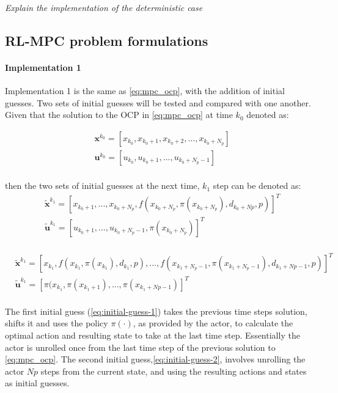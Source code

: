 \emph{Explain the implementation of the deterministic case}
\subsection{RL-MPC problem formulations}

\paragraph{Implementation 1}
Implementation 1 is the same as \autoref{eq:mpc_ocp}, with the addition of initial guesses. Two sets of initial guesses will be tested and compared with one another. Given that the solution to the OCP in \autoref{eq:mpc_ocp} at time $k_0$ denoted as:


\begin{equation}\label{eq:sol-mpc-ocp}
	\begin{aligned}
		&\mathbf{x}^{k_0} = [x_{k_0},x_{k_0 + 1},x_{k_0 + 2}, ...,x_{k_0 + N_p}] \\ 
		&\mathbf{u}^{k_0} = [u_{k_0},u_{k_0 + 1}, ...,u_{k_0 + N_p-1}] \\
	\end{aligned}
\end{equation}

then the two sets of initial guesses at the next time, $k_1$ step can be denoted as:
\begin{equation}\label{eq:initial-guess-1}
	\begin{aligned}
		&\tilde{\mathbf{x}}^{k_1} = [x_{k_0 + 1},...,x_{k_0 + N_p}, f(x_{k_0 + N_p}, \pi(x_{k_0 + N_p}), d_{k_0 + Np},p)]^T \\ 
		&\tilde{\mathbf{u}}^{k_1} = [u_{k_0 + 1},...,u_{k_0 + N_p - 1}, \pi(x_{k_0 + N_p})]^T \\ 
	\end{aligned}
\end{equation}

\begin{equation}\label{eq:initial-guess-2}
	\begin{aligned}
	&\tilde{\mathbf{x}}^{k_1} = [x_{k_1},f(x_{k_1},\pi(x_{k_1}),d_{k_1},p),..., f(x_{k_1 + N_p-1}, \pi(x_{k_1 + N_p-1}), d_{k_1 + Np-1},p)]^T \\ 
	&\tilde{\mathbf{u}}^{k_1} = [\pi(x_{k_1},\pi(x_{k_1+1}),...,\pi(x_{k_1+Np-1})]^T \\ 
\end{aligned}
\end{equation}

The first initial guess (\autoref{eq:initial-guess-1}) takes the previous time steps solution, shifts it and uses the policy $\pi(\cdot)$, as provided by the actor, to calculate the optimal action and resulting state to take at the last time step. Essentially the actor is unrolled once from the last time step of the previous solution to \autoref{eq:mpc_ocp}. The second initial guess,\autoref{eq:initial-guess-2}, involves unrolling the actor $Np$ steps from the current state, and using the resulting actions and states as initial guesses. 

